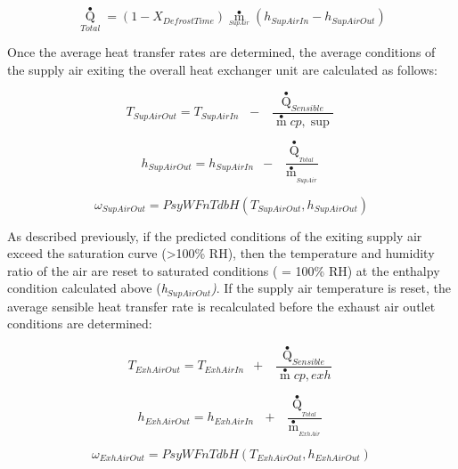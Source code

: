 \begin{equation}
{\mathop Q\limits^ \bullet_{Total}} = (1 - {X_{DefrostTime}}){\mathop m\limits^ \bullet_{_{SupAir}}}({h_{SupAirIn}} - {h_{SupAirOut}})
\end{equation}

Once the average heat transfer rates are determined, the average conditions of the supply air exiting the overall heat exchanger unit are calculated as follows:

\begin{equation}
{T_{SupAirOut}} = {T_{SupAirIn\,}}\,\,\, - \,\,\,\frac{{{{\mathop Q\limits^ \bullet  }_{Sensible}}}}{{\mathop m\limits^ \bullet  cp,\sup }}
\end{equation}

\begin{equation}
{h_{SupAirOut}} = {h_{SupAirIn}}\,\,\, - \,\,\,\frac{{{{\mathop Q\limits^ \bullet  }_{_{Total}}}}}{{{{\mathop m\limits^ \bullet  }_{_{SupAir}}}}}
\end{equation}

\begin{equation}
{\omega_{SupAirOut}} = PsyWFnTdbH({T_{SupAirOut}},{h_{SupAirOut}})
\end{equation}

As described previously, if the predicted conditions of the exiting supply air exceed the saturation curve (\textgreater{}100\% RH), then the temperature and humidity ratio of the air are reset to saturated conditions ( = 100\% RH) at the enthalpy condition calculated above (\emph{h\(_{SupAirOut}\))}. If the supply air temperature is reset, the average sensible heat transfer rate is recalculated before the exhaust air outlet conditions are determined:

\begin{equation}
{T_{ExhAirOut}} = {T_{ExhAirIn}}\,\,\, + \,\,\,\frac{{{{\mathop Q\limits^ \bullet  }_{Sensible}}}}{{\mathop m\limits^ \bullet  cp,exh}}
\end{equation}

\begin{equation}
{h_{ExhAirOut}} = {h_{ExhAirIn}}\,\,\,\, + \,\,\,\frac{{{{\mathop Q\limits^ \bullet  }_{_{Total}}}}}{{{{\mathop m\limits^ \bullet  }_{_{ExhAir}}}}}
\end{equation}

\begin{equation}
{\omega_{ExhAirOut}} = PsyWFnTdbH({T_{ExhAirOut}},{h_{ExhAirOut}})
\end{equation}

